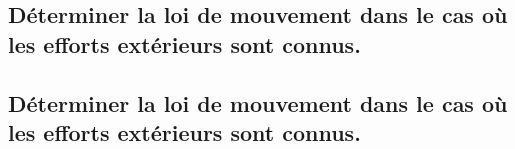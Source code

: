 \documentclass[10pt,fleqn]{book}
\newcommand{\repRel}{../..}
\newcommand{\repStyle}{\repRel/Style}
\newcommand{\td}{fichier_td}
\newcommand{\repExos}{\repRel/ExercicesCompetences}
\newcommand{\repExo}{dossier}
\begin{document}
\subsection{Déterminer la loi de mouvement dans le cas où les efforts extérieurs sont connus.} 

\subsection{Déterminer la loi de mouvement dans le cas où les efforts extérieurs sont connus.} 

\renewcommand{\repExo}{\repExos/C2_MettreEnOeuvreDemarche/C2_09_DeterminerLoiMouvement/01_T}
\renewcommand{\td}{01_T}
\graphicspath{{\repStyle/png/}{\repExo/images/}}


\renewcommand{\repExo}{\repExos/C2_MettreEnOeuvreDemarche/C2_09_DeterminerLoiMouvement/02_R}
\renewcommand{\td}{02_R}
\graphicspath{{\repStyle/png/}{\repExo/images/}}


\renewcommand{\repExo}{\repExos/C2_MettreEnOeuvreDemarche/C2_09_DeterminerLoiMouvement/03_TT}
\renewcommand{\td}{03_TT}
\graphicspath{{\repStyle/png/}{\repExo/images/}}


\renewcommand{\repExo}{\repExos/C2_MettreEnOeuvreDemarche/C2_09_DeterminerLoiMouvement/04_RR}
\renewcommand{\td}{04_RR}
\graphicspath{{\repStyle/png/}{\repExo/images/}}


\renewcommand{\repExo}{\repExos/C2_MettreEnOeuvreDemarche/C2_09_DeterminerLoiMouvement/05_RT}
\renewcommand{\td}{05_RT}
\graphicspath{{\repStyle/png/}{\repExo/images/}}


\renewcommand{\repExo}{\repExos/C2_MettreEnOeuvreDemarche/C2_09_DeterminerLoiMouvement/06_TR}
\renewcommand{\td}{06_TR}
\graphicspath{{\repStyle/png/}{\repExo/images/}}


\renewcommand{\repExo}{\repExos/C2_MettreEnOeuvreDemarche/C2_09_DeterminerLoiMouvement/07_RR3D}
\renewcommand{\td}{07_RR3D}
\graphicspath{{\repStyle/png/}{\repExo/images/}}


\renewcommand{\repExo}{\repExos/C2_MettreEnOeuvreDemarche/C2_09_DeterminerLoiMouvement/08_RR3D}
\renewcommand{\td}{08_RR3D}
\graphicspath{{\repStyle/png/}{\repExo/images/}}


\renewcommand{\repExo}{\repExos/C2_MettreEnOeuvreDemarche/C2_09_DeterminerLoiMouvement/09_RT_RSG}
\renewcommand{\td}{09_RT_RSG}
\graphicspath{{\repStyle/png/}{\repExo/images/}}

\end{document}
